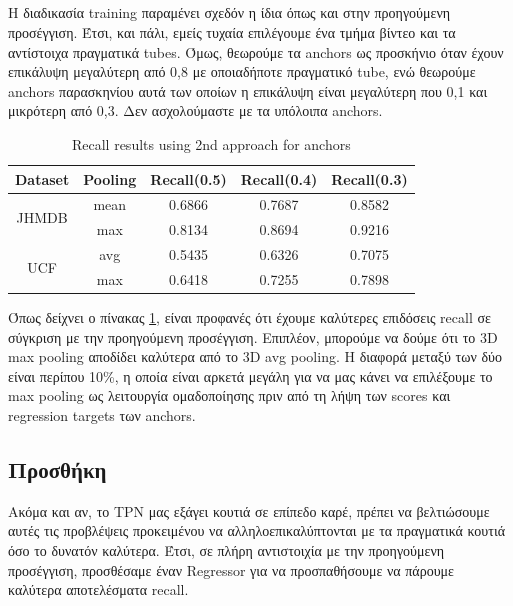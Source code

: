 \subsection{}
Η διαδικασία \en training \gr παραμένει σχεδόν η ίδια όπως και στην προηγούμενη προσέγγιση. Έτσι, και πάλι, εμείς τυχαία επιλέγουμε ένα τμήμα βίντεο και τα αντίστοιχα πραγματικά \en tubes\gr. Όμως,
θεωρούμε τα \en anchors \gr ως προσκήνιο όταν έχουν επικάλυψη  μεγαλύτερη από 0,8 με οποιαδήποτε πραγματικό \en tube\gr, ενώ θεωρούμε \en anchors \gr παρασκηνίου αυτά  των οποίων η επικάλυψη
είναι μεγαλύτερη που 0,1 και μικρότερη από 0,3. Δεν ασχολούμαστε με τα υπόλοιπα \en anchors\gr. 

\en
\begin{table}[h]
  \centering
  \begin{tabular}{||c | c || c  c c||}
    \hline
    \textbf{Dataset} & \textbf{Pooling} &  \textbf{Recall(0.5)} & \textbf{Recall(0.4)} & \textbf{Recall(0.3)} \\
    \hline  \hline
    \multirow{2}{4em}{JHMDB} & mean & 0.6866 & 0.7687 & 0.8582 \\
    \cline{2-5}
    {} & max &  0.8134 & 0.8694 & 0.9216 \\
    \hline
    \multirow{2}{4em}{UCF} & avg &  0.5435 & 0.6326 & 0.7075 \\
    \cline{2-5}
    {} & max & 0.6418 & 0.7255 & 0.7898 \\
    \hline
  \end{tabular}
  \caption{\en Recall results using 2nd approach for anchors}
  \label{table:gr_tpn_2_1}
\end{table}
\gr


Όπως δείχνει ο πίνακας \ref{table:gr_tpn_2_1}, είναι προφανές ότι έχουμε καλύτερες επιδόσεις \en recall \gr σε σύγκριση με την προηγούμενη προσέγγιση.
Επιπλέον, μπορούμε να δούμε ότι το \en 3D max pooling \gr  αποδίδει καλύτερα από το \en 3D avg pooling\gr. Η διαφορά
μεταξύ των δύο είναι περίπου 10\%, η οποία είναι αρκετά μεγάλη για να μας κάνει να επιλέξουμε το \en max pooling \gr ως λειτουργία ομαδοποίησης πριν από τη
λήψη των \en scores \gr και \en regression targets \gr των \en anchors\gr.

\subsection{Προσθήκη }

Ακόμα και αν, το  \en TPN \gr μας εξάγει κουτιά σε επίπεδο καρέ, πρέπει να βελτιώσουμε αυτές τις προβλέψεις προκειμένου να αλληλοεπικαλύπτονται
με τα πραγματικά κουτιά  όσο το δυνατόν καλύτερα.
Έτσι, σε πλήρη αντιστοιχία με την προηγούμενη προσέγγιση, προσθέσαμε έναν \en Regressor \gr για να προσπαθήσουμε να πάρουμε καλύτερα αποτελέσματα \en recall\gr.

